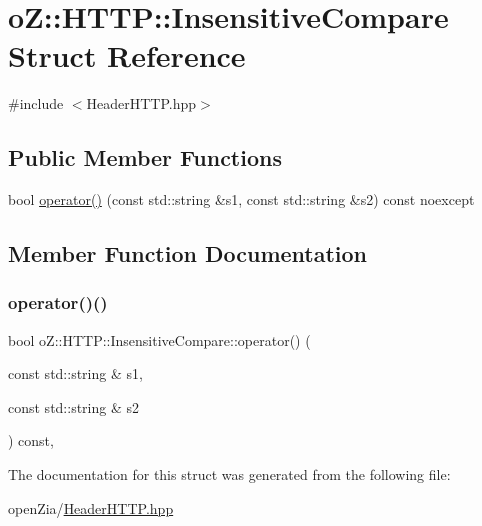 \hypertarget{structo_z_1_1_h_t_t_p_1_1_insensitive_compare}{}\section{oZ\+::H\+T\+TP\+::Insensitive\+Compare Struct Reference}
\label{structo_z_1_1_h_t_t_p_1_1_insensitive_compare}


{\ttfamily \#include $<$Header\+H\+T\+T\+P.\+hpp$>$}

\subsection*{Public Member Functions}
\begin{DoxyCompactItemize}
\item 
bool \mbox{\hyperlink{structo_z_1_1_h_t_t_p_1_1_insensitive_compare_a7b84c1c1ce4c81aa2b452fd3d1fd8843}{operator()}} (const std\+::string \&s1, const std\+::string \&s2) const noexcept
\end{DoxyCompactItemize}


\subsection{Member Function Documentation}
\mbox{\label{structo_z_1_1_h_t_t_p_1_1_insensitive_compare_a7b84c1c1ce4c81aa2b452fd3d1fd8843}} 
\subsubsection{\texorpdfstring{operator()()}{operator()()}}
{\footnotesize\ttfamily bool o\+Z\+::\+H\+T\+T\+P\+::\+Insensitive\+Compare\+::operator() (\begin{DoxyParamCaption}\item[{const std\+::string \&}]{s1,  }\item[{const std\+::string \&}]{s2 }\end{DoxyParamCaption}) const\hspace{0.3cm}{\ttfamily [inline]}, {\ttfamily [noexcept]}}



The documentation for this struct was generated from the following file\+:\begin{DoxyCompactItemize}
\item 
open\+Zia/\mbox{\hyperlink{_header_h_t_t_p_8hpp}{Header\+H\+T\+T\+P.\+hpp}}\end{DoxyCompactItemize}
